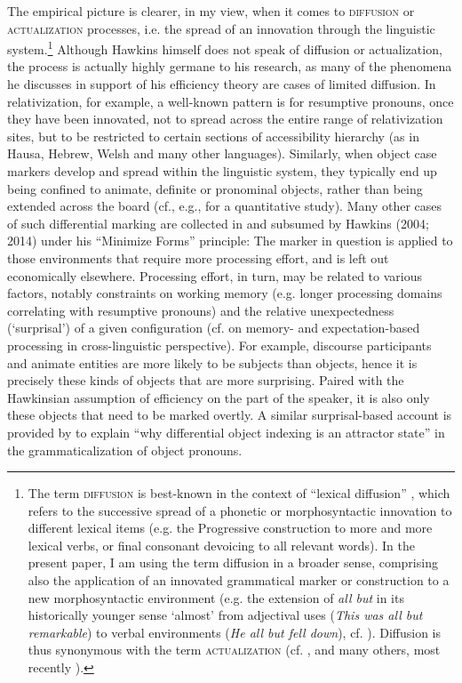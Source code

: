 \documentclass[output=paper]{langsci/langscibook}
\begin{document}
The empirical picture is clearer, in my view, when it comes to \textsc{diffusion} or \textsc{actualization} processes, i.e. the spread of an innovation through the linguistic system.\footnote{The term \textsc{diffusion} is best-known in the context of “lexical diffusion” \citep{Wang1969}, which refers to the successive spread of a phonetic or morphosyntactic innovation to different lexical items (e.g. the Progressive construction to more and more lexical verbs, or final consonant devoicing to all relevant words). In the present paper, I am using the term diffusion in a broader sense, comprising also the application of an innovated grammatical marker or construction to a new morphosyntactic environment (e.g. the extension of \textit{all but} in its historically younger sense ‘almost’ from adjectival uses (\textit{This was all but remarkable}) to verbal environments (\textit{He all but fell down}), cf.  \citealt{DeSmet2012}). Diffusion is thus synonymous with the term \textsc{actualization} (cf. \citealt{Timberlake1977}, \citealt{Andersen2001} and many others, most recently  \citealt{DeSmet2012}).} Although Hawkins himself does not speak of diffusion or actualization, the process is actually highly germane to his research, as many of the phenomena he discusses in support of his efficiency theory are cases of limited diffusion. In relativization, for example, a well-known pattern is for resumptive pronouns, once they have been innovated, not to spread across the entire range of relativization sites, but to be restricted to certain sections of  accessibility hierarchy (as in Hausa, Hebrew, Welsh and many other languages). Similarly, when object case markers develop and spread within the linguistic system, they typically end up being confined to animate, definite or pronominal objects, rather than being extended across the board (cf., e.g., \citealt{Sinnemäki2014} for a quantitative study). Many other cases of such differential marking are collected in \citet{Haspelmath2008} and subsumed by Hawkins (2004; 2014) under his “Minimize Forms” principle: The marker in question is applied to those environments that require more processing effort, and is left out economically elsewhere. Processing effort, in turn, may be related to various factors, notably constraints on working memory (e.g. longer processing domains correlating with resumptive pronouns) and the relative unexpectedness (‘surprisal’) of a given configuration (cf. \citealt{NorcliffeEtAl2015} on memory- and expectation-based processing in cross-linguistic perspective). For example, discourse participants and animate entities are more likely to be subjects than objects, hence it is precisely these kinds of objects that are more surprising. Paired with the Hawkinsian assumption of efficiency on the part of the speaker, it is also only these objects that need to be marked overtly. A similar surprisal-based account is provided by \citet{Haig2018} to explain “why differential object indexing is an attractor state” \citep[781]{Haig2018} in the grammaticalization of object pronouns.
\end{document}
